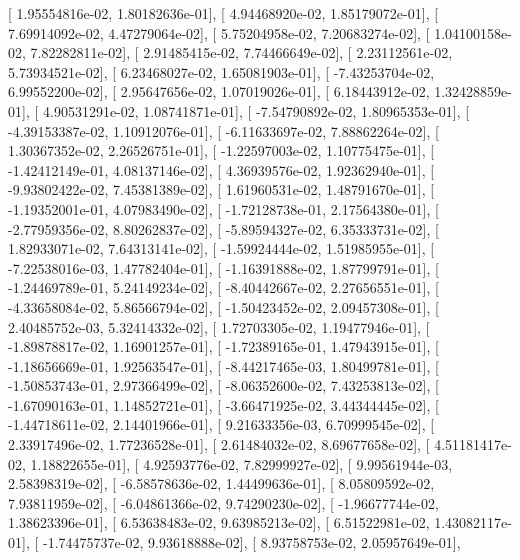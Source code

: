 \documentclass{article}
\begin{document}
       [  1.95554816e-02,   1.80182636e-01],
       [  4.94468920e-02,   1.85179072e-01],
       [  7.69914092e-02,   4.47279064e-02],
       [  5.75204958e-02,   7.20683274e-02],
       [  1.04100158e-02,   7.82282811e-02],
       [  2.91485415e-02,   7.74466649e-02],
       [  2.23112561e-02,   5.73934521e-02],
       [  6.23468027e-02,   1.65081903e-01],
       [ -7.43253704e-02,   6.99552200e-02],
       [  2.95647656e-02,   1.07019026e-01],
       [  6.18443912e-02,   1.32428859e-01],
       [  4.90531291e-02,   1.08741871e-01],
       [ -7.54790892e-02,   1.80965353e-01],
       [ -4.39153387e-02,   1.10912076e-01],
       [ -6.11633697e-02,   7.88862264e-02],
       [  1.30367352e-02,   2.26526751e-01],
       [ -1.22597003e-02,   1.10775475e-01],
       [ -1.42412149e-01,   4.08137146e-02],
       [  4.36939576e-02,   1.92362940e-01],
       [ -9.93802422e-02,   7.45381389e-02],
       [  1.61960531e-02,   1.48791670e-01],
       [ -1.19352001e-01,   4.07983490e-02],
       [ -1.72128738e-01,   2.17564380e-01],
       [ -2.77959356e-02,   8.80262837e-02],
       [ -5.89594327e-02,   6.35333731e-02],
       [  1.82933071e-02,   7.64313141e-02],
       [ -1.59924444e-02,   1.51985955e-01],
       [ -7.22538016e-03,   1.47782404e-01],
       [ -1.16391888e-02,   1.87799791e-01],
       [ -1.24469789e-01,   5.24149234e-02],
       [ -8.40442667e-02,   2.27656551e-01],
       [ -4.33658084e-02,   5.86566794e-02],
       [ -1.50423452e-02,   2.09457308e-01],
       [  2.40485752e-03,   5.32414332e-02],
       [  1.72703305e-02,   1.19477946e-01],
       [ -1.89878817e-02,   1.16901257e-01],
       [ -1.72389165e-01,   1.47943915e-01],
       [ -1.18656669e-01,   1.92563547e-01],
       [ -8.44217465e-03,   1.80499781e-01],
       [ -1.50853743e-01,   2.97366499e-02],
       [ -8.06352600e-02,   7.43253813e-02],
       [ -1.67090163e-01,   1.14852721e-01],
       [ -3.66471925e-02,   3.44344445e-02],
       [ -1.44718611e-02,   2.14401966e-01],
       [  9.21633356e-03,   6.70999545e-02],
       [  2.33917496e-02,   1.77236528e-01],
       [  2.61484032e-02,   8.69677658e-02],
       [  4.51181417e-02,   1.18822655e-01],
       [  4.92593776e-02,   7.82999927e-02],
       [  9.99561944e-03,   2.58398319e-02],
       [ -6.58578636e-02,   1.44499636e-01],
       [  8.05809592e-02,   7.93811959e-02],
       [ -6.04861366e-02,   9.74290230e-02],
       [ -1.96677744e-02,   1.38623396e-01],
       [  6.53638483e-02,   9.63985213e-02],
       [  6.51522981e-02,   1.43082117e-01],
       [ -1.74475737e-02,   9.93618888e-02],
       [  8.93758753e-02,   2.05957649e-01],
\end{document}
